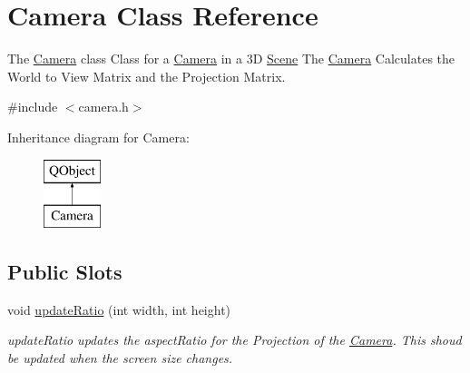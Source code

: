 \hypertarget{class_camera}{}\section{Camera Class Reference}
\label{class_camera}


The \hyperlink{class_camera}{Camera} class Class for a \hyperlink{class_camera}{Camera} in a 3\+D \hyperlink{class_scene}{Scene} The \hyperlink{class_camera}{Camera} Calculates the World to View Matrix and the Projection Matrix.  




{\ttfamily \#include $<$camera.\+h$>$}

Inheritance diagram for Camera\+:\begin{figure}[H]
\begin{center}
\leavevmode
\includegraphics[height=2.000000cm]{class_camera}
\end{center}
\end{figure}
\subsection*{Public Slots}
\begin{DoxyCompactItemize}
\item 
void \hyperlink{class_camera_ab54c500b9e9cb8281bf89e15b767b3ac}{update\+Ratio} (int width, int height)
\begin{DoxyCompactList}\small\item\em update\+Ratio updates the aspect\+Ratio for the Projection of the \hyperlink{class_camera}{Camera}. This shoud be updated when the screen size changes. \end{DoxyCompactList}\end{DoxyCompactItemize}
